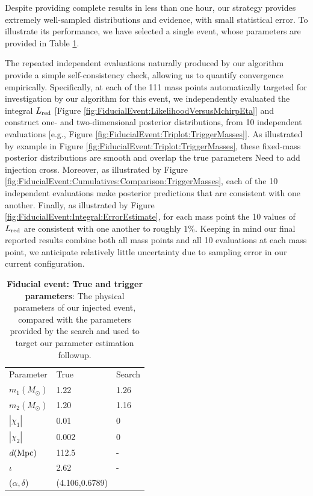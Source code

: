 \documentclass[twocolumn,prd,nofootinbib]{revtex4}
\newcommand\editremark[1]{{\color{red} #1}}
\newcommand\unit[1]{{\rm #1}}
\begin{document}
Despite providing complete results in less than one hour, our strategy provides extremely well-sampled distributions and
evidence, with small statistical error.   To illustrate its performance, we have selected a single event, whose
parameters are provided in Table \ref{tab:FiducialEvent:Parameters}.   
%



The repeated independent evaluations naturally produced by our algorithm provide a simple self-consistency check,
allowing us to quantify convergence empirically.  
Specifically, at each of the 111 mass points automatically targeted for investigation by our algorithm for this event, we
independently evaluated the integral $L_{\rm red}$ [Figure \ref{fig:FiducialEvent:LikelihoodVersusMchirpEta}] and construct one- and two-dimensional posterior distributions, from
10 independent evaluations [e.g., Figure \ref{fig:FiducialEvent:Triplot:TriggerMasses}].    
%
As illustrated by example in Figure \ref{fig:FiducialEvent:Triplot:TriggerMasses}, these fixed-mass posterior
distributions are smooth and overlap the true parameters \editremark{Need to add injection cross}.  
%
Moreover, as illustrated by Figure \ref{fig:FiducialEvent:Cumulatives:Comparison:TriggerMasses}, each of the 10
independent evaluations make posterior predictions that are consistent with one another.   
%
Finally, as illustrated by Figure \ref{fig:FiducialEvent:Integral:ErrorEstimate}, for each mass point the 10 values of $L_{\rm red}$
are consistent with one another to roughly $1\%$.  
%
Keeping in mind our final reported results combine both all mass points and all 10 evaluations at each mass point, we
anticipate relatively little uncertainty due to sampling error in our current configuration.  


\begin{table}
\begin{tabular}{l|ll}
Parameter & True & Search \\
$m_1 (M_\odot)$ &  1.22 & 1.26 \\
$m_2 (M_\odot)$ &  1.20 & 1.16 \\
$|\chi_1| $ & 0.01  & 0 \\
$|\chi_2| $ & 0.002 & 0 \\
$d (\unit{Mpc}) $ & 112.5 & - \\
$\iota $ & 2.62 & - \\
($\alpha,\delta$) & (4.106,0.6789) &\\
\end{tabular}
\caption{\label{tab:FiducialEvent:Parameters}\textbf{Fiducial event: True and trigger parameters}: The physical parameters of our injected event, compared
  with the parameters provided by the search and used to target our parameter estimation followup.
}
\end{table}
\end{document}
